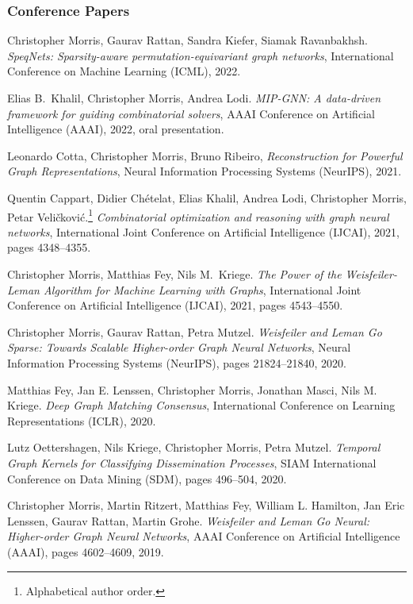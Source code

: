\documentclass[11pt, a4paper, DIV=12]{scrartcl}
\begin{document}
\begin{thebibliography}{5}

\subsubsection*{Conference Papers}

	Christopher Morris, Gaurav Rattan, Sandra Kiefer, Siamak Ravanbakhsh.
	\emph{SpeqNets: Sparsity-aware permutation-equivariant graph networks},
	International Conference on Machine Learning (ICML), 2022.

	Elias B.\, Khalil, Christopher Morris, Andrea Lodi.
	\emph{MIP-GNN: A data-driven framework for guiding combinatorial solvers}, 
	 AAAI Conference on Artificial Intelligence (AAAI), 2022, oral presentation.
	
    	Leonardo Cotta, Christopher Morris, Bruno Ribeiro,
	\emph{Reconstruction for Powerful Graph Representations},
	Neural Information Processing Systems (NeurIPS), 2021.	

	Quentin Cappart, Didier Chételat, Elias Khalil, Andrea Lodi, Christopher Morris, Petar Veli\v{c}kovi\'{c}.\footnote[1]{Alphabetical author order.}
	\emph{Combinatorial optimization and reasoning with graph neural networks},
    	International Joint Conference on Artificial Intelligence (IJCAI), 2021, pages 4348--4355.

	Christopher Morris, Matthias Fey, Nils M.~Kriege.
	\emph{The Power of the Weisfeiler-Leman Algorithm for Machine Learning with Graphs},
	International Joint Conference on Artificial Intelligence (IJCAI), 2021, pages 4543--4550.

   	 Christopher Morris, Gaurav Rattan, Petra Mutzel.
	\emph{Weisfeiler and Leman Go Sparse: Towards Scalable Higher-order Graph Neural Networks},
	Neural Information Processing Systems (NeurIPS), pages 21824--21840, 2020.

	Matthias Fey, Jan E. Lenssen, Christopher Morris, Jonathan Masci, Nils M. Kriege.
    \emph{Deep Graph Matching Consensus},
	International Conference on Learning Representations (ICLR), 2020.
	
	Lutz Oettershagen, Nils Kriege, Christopher Morris, Petra Mutzel.
	\emph{Temporal Graph Kernels for Classifying Dissemination Processes},
	SIAM International Conference on Data Mining (SDM), pages 496--504, 2020.
	
	Christopher Morris, Martin Ritzert, Matthias Fey, William L. Hamilton, Jan Eric Lenssen, Gaurav Rattan, Martin Grohe.
	\newblock \emph{Weisfeiler and Leman Go Neural: Higher-order Graph Neural Networks},
	\newblock AAAI Conference on Artificial Intelligence (AAAI), pages 4602--4609, 2019.
	

\end{thebibliography}
\end{document}
